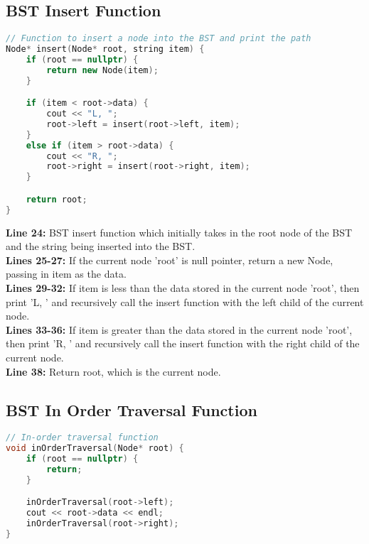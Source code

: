 \documentclass[letterpaper, 10pt,DIV=13]{scrartcl}
\numberwithin{equation}{section} %
\numberwithin{figure}{section} %
\numberwithin{table}{section} %
\begin{document}
\subsection{BST Insert Function}
\begin{linenumbers}
\begin{lstlisting}[language=C++, caption={BST Insert Function}, label={code:example}]
// Function to insert a node into the BST and print the path
Node* insert(Node* root, string item) {
    if (root == nullptr) {
        return new Node(item);
    }

    if (item < root->data) {
        cout << "L, ";
        root->left = insert(root->left, item);
    }
    else if (item > root->data) {
        cout << "R, ";
        root->right = insert(root->right, item);
    }

    return root;
}
\end{lstlisting}
\end{linenumbers}
\nolinenumbers

\textbf{Line 24:} BST insert function which initially takes in the root node of the BST and the string being inserted into the BST. \\
\textbf{Lines 25-27:}  If the current node 'root' is null pointer, return a new Node, passing in item as the data. \\
\textbf{Lines 29-32:}  If item is less than the data stored in the current node 'root', then print 'L, ' and recursively call the insert function with the left child of the current node. \\
\textbf{Lines 33-36:}  If item is greater than the data stored in the current node 'root', then print 'R, ' and recursively call the insert function with the right child of the current node. \\
\textbf{Line 38:} Return root, which is the current node.

\subsection{BST In Order Traversal Function}
\begin{linenumbers}
\begin{lstlisting}[language=C++, caption={BST In Order Traversal Function}, label={code:example}]
// In-order traversal function
void inOrderTraversal(Node* root) {
    if (root == nullptr) {
        return;
    }

    inOrderTraversal(root->left);
    cout << root->data << endl;
    inOrderTraversal(root->right);
}
\end{lstlisting}
\end{linenumbers}
\nolinenumbers
\end{document}
